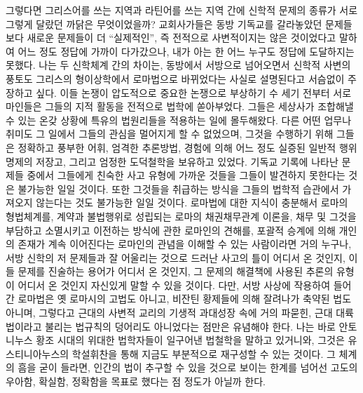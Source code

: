 그렇다면
그리스어를 쓰는 지역과
라틴어를 쓰는 지역 간에
신학적 문제의 종류가 서로 그렇게 달랐던 까닭은 무엇이었을까?
교회사가들은
동방 기독교를 갈라놓았던 문제들보다
새로운 문제들이
더 ``실제적인'',
즉 전적으로 사변적이지는 않은 것이었다고 말하여
어느 정도 정답에 가까이 다가갔으나,
내가 아는 한 어느 누구도 정답에 도달하지는 못했다.
나는
두 신학체계 간의 차이는,
동방에서 서방으로 넘어오면서
신학적 사변의 풍토도
그리스의 형이상학에서 로마법으로 바뀌었다는 사실로
설명된다고
서슴없이 주장하고 싶다.
이들 논쟁이 압도적으로 중요한 논쟁으로 부상하기
수 세기 전부터
서로마인들은 그들의 지적 활동을 전적으로 법학에 쏟아부었다.
그들은
세상사가 조합해낼 수 있는 온갖 상황에
특유의 법원리들을
적용하는 일에 몰두해왔다.
다른 어떤 업무나 취미도
그 일에서 그들의 관심을 멀어지게 할 수 없었으며,
그것을 수행하기 위해 그들은
정확하고 풍부한 어휘,
엄격한 추론방법,
경험에 의해 어느 정도 실증된 일반적 행위 명제의 저장고,
그리고 엄정한 도덕철학을
보유하고 있었다.
기독교 기록에 나타난 문제들 중에서
그들에게 친숙한 사고 유형에 가까운 것들을
그들이
발견하지 못한다는 것은 불가능한 일일 것이다.
또한 그것들을 취급하는 방식을
그들의 법학적 습관에서 가져오지 않는다는 것도 불가능한 일일 것이다.
로마법에 대한 지식이 충분해서
로마의 형법체계를,
계약과 불법행위로 성립되는 로마의 채권채무관계 이론을,
채무 및 그것을 부담하고 소멸시키고 이전하는 방식에 관한
로마인의 견해를,
포괄적 승계에 의해 개인의 존재가 계속 이어진다는 로마인의 관념을
이해할 수 있는 사람이라면 거의 누구나,
서방 신학의 저 문제들과 잘 어울리는 것으로 드러난 사고의 틀이 어디서 온 것인지,
이들 문제를 진술하는 용어가 어디서 온 것인지,
그 문제의 해결책에 사용된 추론의 유형이 어디서 온 것인지
자신있게 말할 수 있을 것이다.
다만,
서방 사상에 작용하여 들어간 로마법은
옛 로마시의 고법도 아니고,
비잔틴 황제들에 의해 잘려나가 축약된 법도 아니며,
그렇다고 근대의 사변적 교리의 기생적 과대성장 속에 거의 파묻힌,
근대 대륙법이라고 불리는 법규칙의 덩어리도 아니었다는
점만은 유념해야 한다.
나는 바로 안토니누스 황조 시대의 위대한 법학자들이
일구어낸 법철학을 말하고 있거니와,
그것은 유스티니아누스의 학설휘찬을 통해 지금도 부분적으로
재구성할 수 있는 것이다.
그 체계의 흠을 굳이 들라면,
인간의 법이 추구할 수 있을 것으로 보이는 한계를 넘어선
고도의 우아함, 확실함, 정확함을
목표로 했다는 점
정도가 아닐까 한다.

